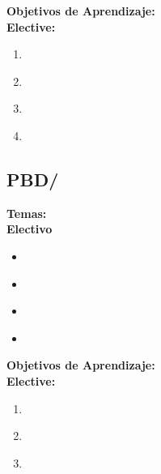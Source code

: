 \noindent \textbf{Objetivos de Aprendizaje:}\\
\noindent \textbf{Elective:}
\begin{enumerate}
	\setcounter{enumi}{0}
	\item \PBDMobilePlatformsLODesignAndMobile\xspace[\PBDMobilePlatformsLODesignAndMobileLevel]\label{sec:BOK:PBDMobilePlatformsLODesignAndMobile}
	\item \PBDMobilePlatformsLODiscussTheMobile\xspace[\PBDMobilePlatformsLODiscussTheMobileLevel]\label{sec:BOK:PBDMobilePlatformsLODiscussTheMobile}
	\item \PBDMobilePlatformsLODiscussThePower\xspace[\PBDMobilePlatformsLODiscussThePowerLevel]\label{sec:BOK:PBDMobilePlatformsLODiscussThePower}
	\item \PBDMobilePlatformsLOCompareAndProgrammingPurpose\xspace[\PBDMobilePlatformsLOCompareAndProgrammingPurposeLevel]\label{sec:BOK:PBDMobilePlatformsLOCompareAndProgrammingPurpose}
\end{enumerate}


\subsection{PBD/\PBDIndustrialPlatforms}\label{sec:BOK:PBDIndustrialPlatforms}
\noindent \textbf{Temas:}\\
\noindent \textbf{Electivo}
\begin{itemize}
	\item \PBDIndustrialPlatformsTopicTypes\label{sec:BOK:PBDIndustrialPlatformsTopicTypes}
	\item \PBDIndustrialPlatformsTopicRobotic\label{sec:BOK:PBDIndustrialPlatformsTopicRobotic}
	\item \PBDIndustrialPlatformsTopicDomain\label{sec:BOK:PBDIndustrialPlatformsTopicDomain}
	\item \PBDIndustrialPlatformsTopicIndustrial\label{sec:BOK:PBDIndustrialPlatformsTopicIndustrial}
\end{itemize}


\noindent \textbf{Objetivos de Aprendizaje:}\\
\noindent \textbf{Elective:}
\begin{enumerate}
	\setcounter{enumi}{0}
	\item \PBDIndustrialPlatformsLODesignAndIndustrial\xspace[\PBDIndustrialPlatformsLODesignAndIndustrialLevel]\label{sec:BOK:PBDIndustrialPlatformsLODesignAndIndustrial}
	\item \PBDIndustrialPlatformsLOCompareAndSpecific\xspace[\PBDIndustrialPlatformsLOCompareAndSpecificLevel]\label{sec:BOK:PBDIndustrialPlatformsLOCompareAndSpecific}
	\item \PBDIndustrialPlatformsLODiscussTheA\xspace[\PBDIndustrialPlatformsLODiscussTheALevel]\label{sec:BOK:PBDIndustrialPlatformsLODiscussTheA}
\end{enumerate}


